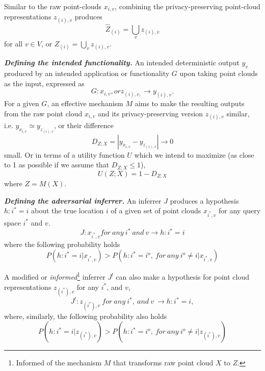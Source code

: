 Similar to the raw point-clouds $x_{i,v}$, combining the privacy-preserving point-cloud representations $z_{(i),v}$ produces
\begin{equation}
	\hat{Z}_{(i)} = \bigcup_{v} z_{(i),v}
	\label{eq:span-z}
\end{equation}
for all $v\in V$, or $Z_{(i)} = \bigcup_{v} z_{(i),v}$.

\emph{\textbf{Defining the intended functionality.}} An intended deterministic output $y_v$ produced by an intended application or functionality $G$ upon taking point clouds as the input, expressed as
\begin{equation}
	G :  x_{i,v},  { or }   z_{(i),v,} \rightarrow y_{(i),v}.
\end{equation}
For a given $G$, an effective mechanism $M$ aims to make the resulting outputs from the raw point cloud $x_{i,v}$ and its privacy-preserving version $z_{(i),v}$ similar, i.e. $y_{x_{i,v}} \simeq y_{z_{(i),v}}$, or their difference
\begin{equation}
	D_{Z;X} = |y_{x_{i,v}} - y_{z_{(i),v}} | \rightarrow 0
\end{equation}
small. Or in terms of a utility function $U$  which we intend to maximize (as close to 1 as possible if we assume that $D_{Z; X}\leq1$),
\begin{equation}
	U(Z; X) = 1 - D_{Z; X}
	\label{eq:utility}
\end{equation}
where $Z = M(X)$.

\emph{\textbf{Defining the adversarial inferrer.}} An inferrer $J$ produces a hypothesis $h : i^*=i$ about the true location $i$ of a given set of point clouds ${x_{i^*,v}}$ for any query space $i^*$ and $v$.
\begin{equation}
	J:{x_{i^*,v} for\ any\ i^*\ and\ v} \rightarrow h : i^*=i
\end{equation}
where the following probability holds
\begin{equation}
	P(h : i^*=i | {x_{i^*,v}} ) > P(h:i^*=i^o,\ for\ any\ i^o \neq i | {x_{i^*,v}} )
	\label{eq:bayesian}
\end{equation}

A modified or \textit{informed}\footnote{Informed of the mechanism $M$ that transforms raw point cloud $X$ to $Z$.} inferrer $J^!$ can also make a hypothesis for point cloud representations $z_{(i^*),v}$ for any $i^*$, and $v$,
\begin{equation}
	J^!:z_{(i^*),v}\ for\ any\ i^*,\ and\ v\ \rightarrow h : i^*=i,
\end{equation}
where, similarly, the following probability also holds
\begin{equation}
P(h : i^*=i | {z_{(i^*),v}} ) > P(h:i^*=i^o,\ for\ any\ i^o \neq i | {z_{(i^*),v}} )
\end{equation}

